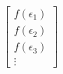 \documentclass[preview]{standalone}
\begin{document}
\begin{align*}
\begin{bmatrix} f(\epsilon_1) \\ f(\epsilon_2) \\ f(\epsilon_3) \\ \vdots \end{bmatrix}
\end{align*}
\end{document}
